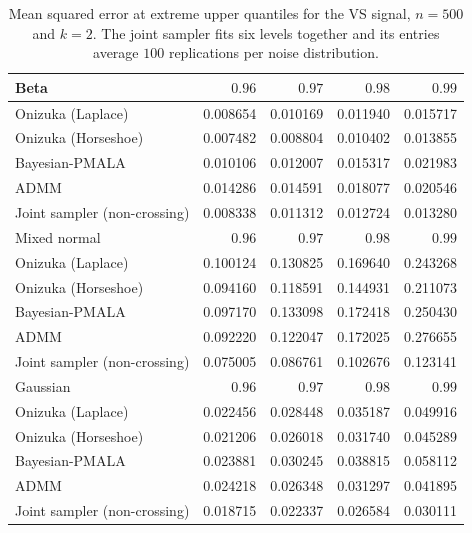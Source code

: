 \begin{table}[!htbp]
\centering
\small
\caption{Mean squared error at extreme upper quantiles for the VS signal, $n=500$ and $k=2$. The joint sampler fits six levels together and its entries average $100$ replications per noise distribution.}
\label{tab:vs_ext_upper_mse}
\begin{tabular}{lrrrr}
\toprule
Beta & $0.96$ & $0.97$ & $0.98$ & $0.99$ \\
\midrule
Onizuka (Laplace) & 0.008654 & 0.010169 & 0.011940 & 0.015717 \\
Onizuka (Horseshoe) & 0.007482 & 0.008804 & 0.010402 & 0.013855 \\
Bayesian-PMALA & 0.010106 & 0.012007 & 0.015317 & 0.021983 \\
ADMM & 0.014286 & 0.014591 & 0.018077 & 0.020546 \\
Joint sampler (non-crossing) & 0.008338 & 0.011312 & 0.012724 & 0.013280 \\
\midrule
Mixed normal & $0.96$ & $0.97$ & $0.98$ & $0.99$ \\
\midrule
Onizuka (Laplace) & 0.100124 & 0.130825 & 0.169640 & 0.243268 \\
Onizuka (Horseshoe) & 0.094160 & 0.118591 & 0.144931 & 0.211073 \\
Bayesian-PMALA & 0.097170 & 0.133098 & 0.172418 & 0.250430 \\
ADMM & 0.092220 & 0.122047 & 0.172025 & 0.276655 \\
Joint sampler (non-crossing) & 0.075005 & 0.086761 & 0.102676 & 0.123141 \\
\midrule
Gaussian & $0.96$ & $0.97$ & $0.98$ & $0.99$ \\
\midrule
Onizuka (Laplace) & 0.022456 & 0.028448 & 0.035187 & 0.049916 \\
Onizuka (Horseshoe) & 0.021206 & 0.026018 & 0.031740 & 0.045289 \\
Bayesian-PMALA & 0.023881 & 0.030245 & 0.038815 & 0.058112 \\
ADMM & 0.024218 & 0.026348 & 0.031297 & 0.041895 \\
Joint sampler (non-crossing) & 0.018715 & 0.022337 & 0.026584 & 0.030111 \\
\bottomrule
\end{tabular}
\end{table}
